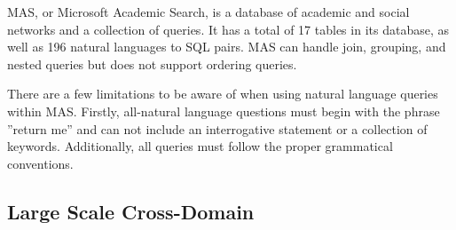 MAS, or Microsoft Academic Search\cite{roy2013the}, is a database of academic and social networks and a collection of queries. It has a total of 17 tables in its database, as well as 196 natural languages to SQL pairs. MAS can handle join, grouping, and nested queries but does not support ordering queries.

There are a few limitations to be aware of when using natural language queries within MAS. Firstly, all-natural language questions must begin with the phrase ”return me” and can not include an interrogative statement or a collection of keywords. Additionally, all queries must follow the proper grammatical conventions.

\clearpage

\subsection{Large Scale Cross-Domain}



